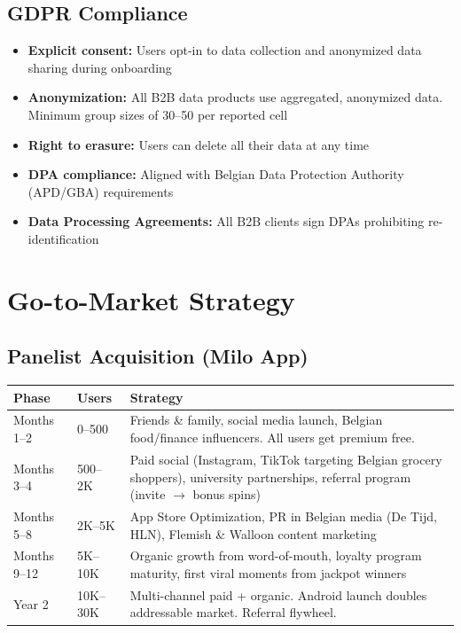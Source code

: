 \documentclass[11pt,a4paper]{article}
\begin{document}
\subsection{GDPR Compliance}

\begin{itemize}[leftmargin=1.5em, itemsep=3pt]
  \item \textbf{Explicit consent:} Users opt-in to data collection and anonymized data sharing during onboarding
  \item \textbf{Anonymization:} All B2B data products use aggregated, anonymized data. Minimum group sizes of 30--50 per reported cell
  \item \textbf{Right to erasure:} Users can delete all their data at any time
  \item \textbf{DPA compliance:} Aligned with Belgian Data Protection Authority (APD/GBA) requirements
  \item \textbf{Data Processing Agreements:} All B2B clients sign DPAs prohibiting re-identification
\end{itemize}

\clearpage

\section{Go-to-Market Strategy}

\subsection{Panelist Acquisition (Milo App)}

\begin{center}
\renewcommand{\arraystretch}{1.3}
\begin{tabularx}{\textwidth}{C{2cm} C{2cm} L{9cm}}
\toprule
{}
\textbf{\color{white}Phase} & \textbf{\color{white}Users} & \textbf{\color{white}Strategy} \\
\midrule
Months 1--2 & 0--500 & Friends \& family, social media launch, Belgian food/finance influencers. All users get premium free. \\
Months 3--4 & 500--2K & Paid social (Instagram, TikTok targeting Belgian grocery shoppers), university partnerships, referral program (invite $\rightarrow$ bonus spins) \\
Months 5--8 & 2K--5K & App Store Optimization, PR in Belgian media (De Tijd, HLN), Flemish \& Walloon content marketing \\
Months 9--12 & 5K--10K & Organic growth from word-of-mouth, loyalty program maturity, first viral moments from jackpot winners \\
Year 2 & 10K--30K & Multi-channel paid + organic. Android launch doubles addressable market. Referral flywheel. \\
\bottomrule
\end{tabularx}
\end{center}
\end{document}

